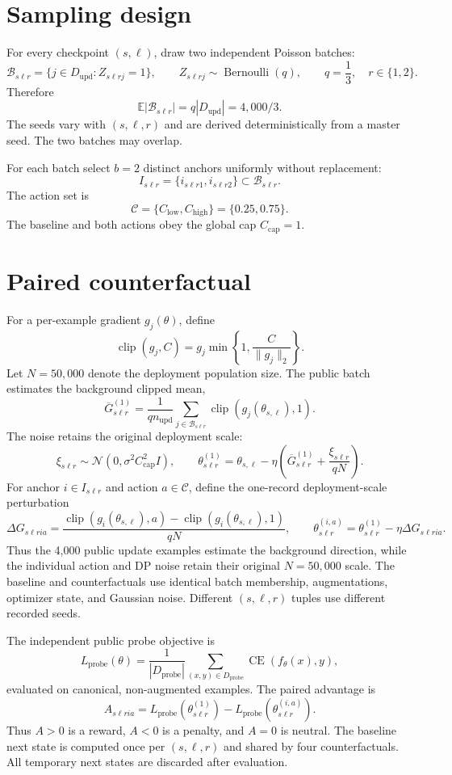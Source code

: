 \documentclass[10pt]{article}
\newcommand{\clip}{\operatorname{clip}}
\newcommand{\CE}{\operatorname{CE}}
\newcommand{\Normal}{\mathcal{N}}
\newcommand{\Dupd}{D_{\mathrm{upd}}}
\newcommand{\Dprobe}{D_{\mathrm{probe}}}
\begin{document}
\section{Sampling design}

For every checkpoint $(s,\ell)$, draw two independent Poisson batches:
\[
  \mathcal{B}_{s\ell r}
  =\{j\in\Dupd:Z_{s\ell rj}=1\},
  \qquad Z_{s\ell rj}\sim\operatorname{Bernoulli}(q),
  \qquad q=\frac13,\quad r\in\{1,2\}.
\]
Therefore
\[
  \mathbb{E}|\mathcal{B}_{s\ell r}|=q|\Dupd|
  =4{,}000/3.
\]
The seeds vary with $(s,\ell,r)$ and are derived deterministically from a
master seed. The two batches may overlap.

For each batch select $b=2$ distinct anchors uniformly without replacement:
\[
  I_{s\ell r}=\{i_{s\ell r1},i_{s\ell r2}\}
  \subset\mathcal{B}_{s\ell r}.
\]
The action set is
\[
  \mathcal{C}=\{C_{\mathrm{low}},C_{\mathrm{high}}\}=\{0.25,0.75\}.
\]
The baseline and both actions obey the global cap
$C_{\mathrm{cap}}=1$.

\section{Paired counterfactual}

For a per-example gradient $g_j(\theta)$, define
\[
  \clip(g_j,C)=g_j\min\left\{1,\frac{C}{\|g_j\|_2}\right\}.
\]
Let $N=50{,}000$ denote the deployment population size. The public batch
estimates the background clipped mean,
\[
  \overline G_{s\ell r}^{(1)}
  =\frac{1}{q n_{\mathrm{upd}}}
    \sum_{j\in\mathcal B_{s\ell r}}\clip(g_j(\theta_{s,\ell}),1).
\]
The noise retains the original deployment scale:
\[
  \xi_{s\ell r}\sim\Normal(0,\sigma^2C_{\mathrm{cap}}^2I),
  \qquad
  \theta_{s\ell r}^{(1)}
  =\theta_{s,\ell}-\eta\left(
      \overline G_{s\ell r}^{(1)}+\frac{\xi_{s\ell r}}{qN}
    \right).
\]
For anchor $i\in I_{s\ell r}$ and action $a\in\mathcal C$, define the
one-record deployment-scale perturbation
\[
  \Delta G_{s\ell ria}
  =\frac{\clip(g_i(\theta_{s,\ell}),a)
          -\clip(g_i(\theta_{s,\ell}),1)}{qN},
  \qquad
  \theta_{s\ell r}^{(i,a)}
  =\theta_{s\ell r}^{(1)}-\eta\Delta G_{s\ell ria}.
\]
Thus the 4,000 public update examples estimate the background direction, while
the individual action and DP noise retain their original $N=50{,}000$ scale.
The baseline and counterfactuals use identical batch membership,
augmentations, optimizer state, and Gaussian noise. Different $(s,\ell,r)$
tuples use different recorded seeds.

The independent public probe objective is
\[
  L_{\mathrm{probe}}(\theta)
  =\frac{1}{|\Dprobe|}
    \sum_{(x,y)\in\Dprobe}\CE(f_\theta(x),y),
\]
evaluated on canonical, non-augmented examples. The paired advantage is
\[
  A_{s\ell ria}
  =L_{\mathrm{probe}}\!\left(\theta_{s\ell r}^{(1)}\right)
   -L_{\mathrm{probe}}\!\left(\theta_{s\ell r}^{(i,a)}\right).
\]
Thus $A>0$ is a reward, $A<0$ is a penalty, and $A=0$ is neutral. The baseline
next state is computed once per $(s,\ell,r)$ and shared by four
counterfactuals. All temporary next states are discarded after evaluation.
\end{document}
